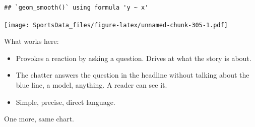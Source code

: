 \documentclass[
]{book}
\providecommand{\tightlist}{%
  \setlength{\itemsep}{0pt}\setlength{\parskip}{0pt}}
\begin{document}
\begin{verbatim}
## `geom_smooth()` using formula 'y ~ x'
\end{verbatim}

\texttt{[image: SportsData\_files/figure-latex/unnamed-chunk-305-1.pdf]}

What works here:

\begin{itemize}
\tightlist
\item
  Provokes a reaction by asking a question. Drives at what the story is about.
\item
  The chatter answers the question in the headline without talking about the blue line, a model, anything. A reader can see it.
\item
  Simple, precise, direct language.
\end{itemize}

One more, same chart.
\end{document}
